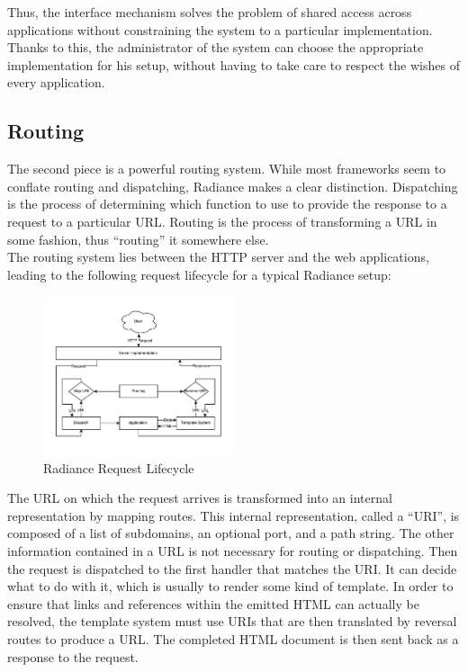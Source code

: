 \documentclass{sig-alternate}
\begin{document}
Thus, the interface mechanism solves the problem of shared access across applications without constraining the system to a particular implementation. Thanks to this, the administrator of the system can choose the appropriate implementation for his setup, without having to take care to respect the wishes of every application. \\

\subsection{Routing}
The second piece is a powerful routing system. While most frameworks seem to conflate routing and dispatching, Radiance makes a clear distinction. Dispatching is the process of determining which function to use to provide the response to a request to a particular URL. Routing is the process of transforming a URL in some fashion, thus ``routing'' it somewhere else. \\

The routing system lies between the HTTP server and the web applications, leading to the following request lifecycle for a typical Radiance setup: \\

\begin{figure}[H]
  \centering
  \includegraphics[width=0.5\textwidth]{request.pdf}
  \caption{Radiance Request Lifecycle}
\end{figure}

The URL on which the request arrives is transformed into an internal representation by mapping routes. This internal representation, called a ``URI'', is composed of a list of subdomains, an optional port, and a path string. The other information contained in a URL is not necessary for routing or dispatching. Then the request is dispatched to the first handler that matches the URI. It can decide what to do with it, which is usually to render some kind of template. In order to ensure that links and references within the emitted HTML can actually be resolved, the template system must use URIs that are then translated by reversal routes to produce a URL. The completed HTML document is then sent back as a response to the request. \\
\end{document}
